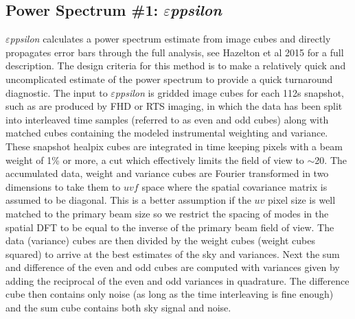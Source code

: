 \documentclass[twolcolumn,iop]{emulateapj}
\def\eppsilon{{\it $\varepsilon$ppsilon}}
\def\eppsiloncite{Hazelton et al 2015}
\begin{document}
\subsection{Power Spectrum \#1: \eppsilon}
\label{sec:EPPSILON}
\eppsilon{} calculates a power spectrum estimate from image cubes and
directly propagates error bars through the full analysis, see \eppsiloncite{} for a full description. The design criteria for this method is to make a relatively quick and uncomplicated estimate of the power spectrum to provide a quick turnaround diagnostic. The input to \eppsilon{} is gridded image cubes for  each 112s snapshot, such as are produced by FHD or RTS imaging, in which the data has been split into interleaved time samples (referred to as even and odd cubes) along with matched cubes containing the modeled instrumental weighting and variance. These snapshot healpix cubes are integrated in time keeping pixels with a beam weight of 1\% or more, a cut which effectively limits the field of view to $\sim$20\arcdeg. The accumulated data, weight and variance cubes are Fourier transformed in two dimensions to take them to $uvf$ space where the spatial covariance matrix is assumed to be diagonal. This is a better assumption if the $uv$ pixel size is well matched to the primary beam size so we restrict the spacing of modes in the spatial DFT to be equal to the inverse of the primary beam field of view. The data (variance) cubes are then divided by the weight cubes (weight cubes squared) to arrive at the best estimates of the sky and variances. Next the sum and difference of the even and odd cubes are computed with variances given by adding the reciprocal of the even and odd variances in quadrature. The difference cube then contains only noise (as long as the time interleaving is fine enough) and the sum cube contains both sky signal and noise.
\end{document}

